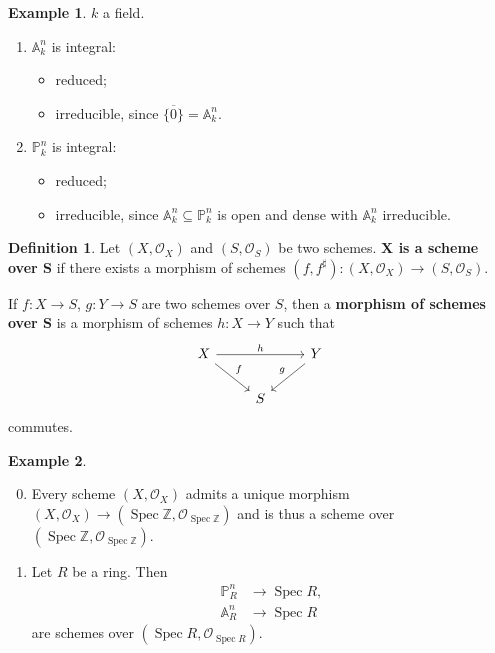 \documentclass[12pt]{article}
\DeclareMathOperator{\Spec}{Spec}
\theoremstyle{definition}
\newtheorem*{definition}{Definition}
\newtheorem*{example}{Example}
\begin{document}
\begin{example}
$k$ a field.
\begin{enumerate}[label=\arabic*)]
\item $\mathbb{A}_k^n$ is integral:
\begin{itemize}[label=$-$]
\item reduced;
\item irreducible, since $\overline{\{0\}}=\mathbb{A}_k^n$.
\end{itemize}

\item $\mathbb{P}_k^n$ is integral:
\begin{itemize}[label=$-$]
\item reduced;
\item irreducible, since $\mathbb{A}_k^n\subseteq\mathbb{P}_k^n$ is open and dense with $\mathbb{A}_k^n$ irreducible.
\end{itemize}
\end{enumerate}
\end{example}

\begin{definition}
Let $(X,\mathcal{O}_X)$ and $(S,\mathcal{O}_S)$ be two schemes. \textbf{$\boldsymbol{X}$ is a scheme over $\boldsymbol{S}$} if there exists a morphism of schemes $(f,f^{\sharp}):(X,\mathcal{O}_X)\rightarrow(S,\mathcal{O}_S)$.

If $f:X\rightarrow S$, $g:Y\rightarrow S$ are two schemes over $S$, then a \textbf{morphism of schemes over $\boldsymbol{S}$} is a morphism of schemes $h:X\rightarrow Y$ such that
\[
\begin{tikzcd}
X\arrow[rr,"h"]\arrow[rd,"f"]&&Y\arrow[dl,"g",swap]\\
&S
\end{tikzcd}
\]
commutes.
\end{definition}

\begin{example}
\begin{enumerate}[label=\arabic*)]
\setcounter{enumi}{-1}
\item Every scheme $(X,\mathcal{O}_X)$ admits a unique morphism $(X,\mathcal{O}_X)\rightarrow(\Spec\mathbb{Z},\mathcal{O}_{\Spec\mathbb{Z}})$ and is thus a scheme over $(\Spec\mathbb{Z},\mathcal{O}_{\Spec\mathbb{Z}})$.

\item Let $R$ be a ring. Then
\begin{align*}
\mathbb{P}_R^n&\longrightarrow\Spec R,\\
\mathbb{A}_R^n&\longrightarrow\Spec R
\end{align*}
are schemes over $(\Spec R,\mathcal{O}_{\Spec R})$.
\end{enumerate}
\end{example}
\end{document}
